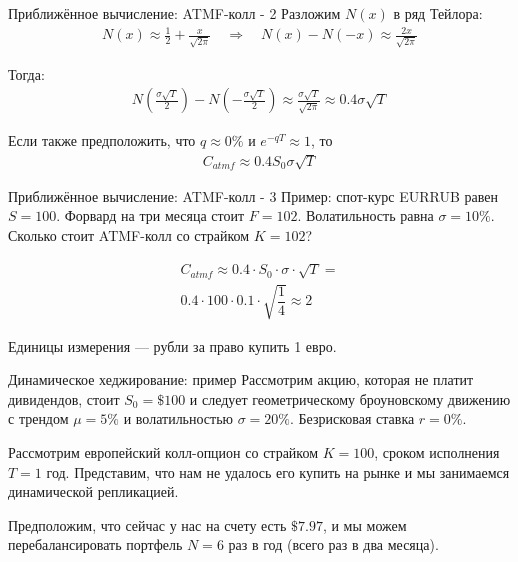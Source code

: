 \documentclass{beamer}
\begin{document}
\begin{frame}{Приближённое вычисление: ATMF-колл - 2}
\justify
Разложим $N(x)$ в ряд Тейлора:
\begin{align*}
N(x) \approx \frac{1}{2} + \frac{x}{\sqrt{2\pi}} \quad \Rightarrow \quad
N(x) - N(-x) \approx \frac{2x}{\sqrt{2\pi}}
\end{align*}

Тогда:
\begin{align*}
N\left(\frac{\sigma \sqrt{T}}{2}\right) - N\left(-\frac{\sigma \sqrt{T}}{2}\right)
\approx
\frac{\sigma\sqrt{T}}{\sqrt{2\pi}}
\approx
0.4\sigma\sqrt{T}
\end{align*}

Если также предположить, что $q\approx 0\%$ и $e^{-qT} \approx 1$, то
\begin{align*}
C_{atmf} \approx 0.4 S_0 \sigma \sqrt{T}
\end{align*}
\end{frame}



\begin{frame}{Приближённое вычисление: ATMF-колл - 3}
\justify
Пример: спот-курс EURRUB равен $S=100$. Форвард на три месяца стоит $F=102$. Волатильность равна $\sigma=10\%$. Сколько стоит ATMF-колл со страйком $K=102$?

\begin{align*}
C_{atmf} \approx 0.4 \cdot S_0 \cdot \sigma \cdot \sqrt{T} = \\
0.4 \cdot 100 \cdot 0.1 \cdot \sqrt{\dfrac{1}{4}} \approx 2
\end{align*}

Единицы измерения --- рубли за право купить 1 евро.
\end{frame}



\begin{frame}{Динамическое хеджирование: пример}
\justify
Рассмотрим акцию, которая не платит дивидендов, стоит $S_0=\$100$ и следует 
геометрическому броуновскому движению с трендом $\mu=5\%$ и волатильностью
$\sigma=20\%$. Безрисковая ставка $r=0\%$.

\justify
Рассмотрим европейский колл-опцион со страйком $K=100$, сроком исполнения $T=1$ год. 
Представим, что нам не удалось его купить на рынке и мы занимаемся динамической 
репликацией.

\justify
Предположим, что сейчас у нас на счету есть $\$7.97$, и мы можем перебалансировать портфель $N=6$ раз в год (всего раз в два месяца).
\end{frame}
\end{document}
